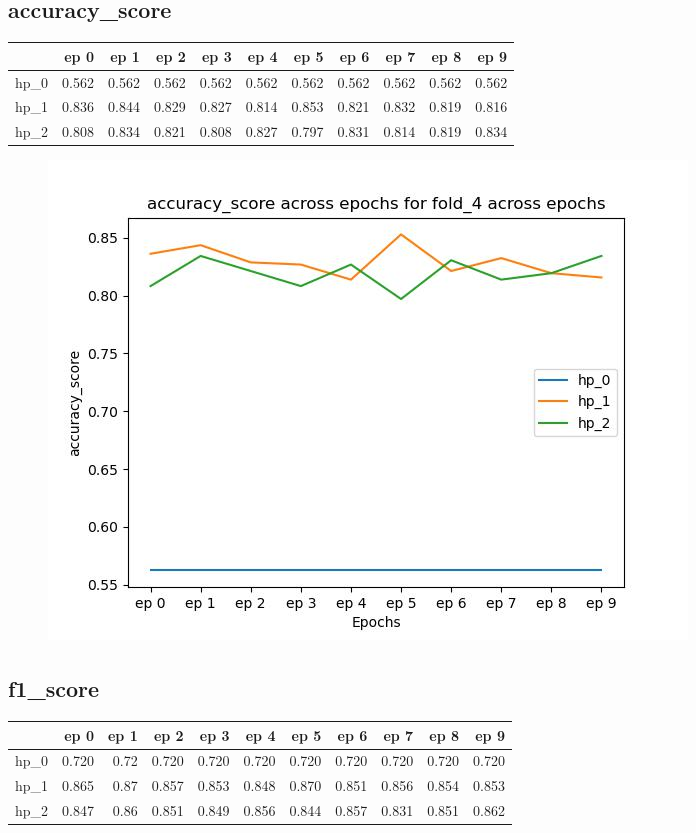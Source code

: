 \documentclass{article}
\begin{document}
\subsection{accuracy\_score}
\begin{tabular}{lrrrrrrrrrr}
\toprule
{} &   ep 0 &   ep 1 &   ep 2 &   ep 3 &   ep 4 &   ep 5 &   ep 6 &   ep 7 &   ep 8 &   ep 9 \\
\midrule
hp\_0 &  0.562 &  0.562 &  0.562 &  0.562 &  0.562 &  0.562 &  0.562 &  0.562 &  0.562 &  0.562 \\
hp\_1 &  0.836 &  0.844 &  0.829 &  0.827 &  0.814 &  0.853 &  0.821 &  0.832 &  0.819 &  0.816 \\
hp\_2 &  0.808 &  0.834 &  0.821 &  0.808 &  0.827 &  0.797 &  0.831 &  0.814 &  0.819 &  0.834 \\
\bottomrule
\end{tabular}

\begin{figure}[H]
\includegraphics[scale = 0.75]{fold_4/accuracy_score}
\end{figure}
\subsection{f1\_score}
\begin{tabular}{lrrrrrrrrrr}
\toprule
{} &   ep 0 &  ep 1 &   ep 2 &   ep 3 &   ep 4 &   ep 5 &   ep 6 &   ep 7 &   ep 8 &   ep 9 \\
\midrule
hp\_0 &  0.720 &  0.72 &  0.720 &  0.720 &  0.720 &  0.720 &  0.720 &  0.720 &  0.720 &  0.720 \\
hp\_1 &  0.865 &  0.87 &  0.857 &  0.853 &  0.848 &  0.870 &  0.851 &  0.856 &  0.854 &  0.853 \\
hp\_2 &  0.847 &  0.86 &  0.851 &  0.849 &  0.856 &  0.844 &  0.857 &  0.831 &  0.851 &  0.862 \\
\bottomrule
\end{tabular}
\end{document}
